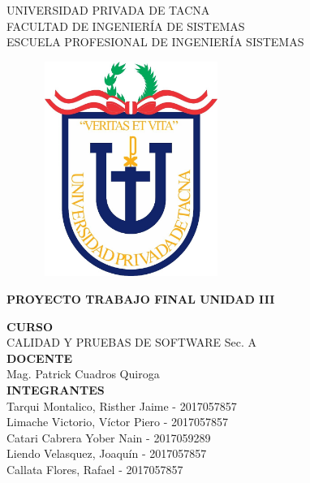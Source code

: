 \documentclass[12pt,a4paper,oneside]{book}
\begin{document}
	
	\thispagestyle{empty} 
	
	\begin{center} 
		\LARGE{UNIVERSIDAD PRIVADA DE TACNA} \\[0.5cm] 
		\Large{FACULTAD DE INGENIERÍA DE SISTEMAS}\\[0.5cm] 
		\large{ ESCUELA PROFESIONAL DE INGENIERÍA SISTEMAS} 
	\end{center}
	
	\begin{figure}[htb]
		\centering \includegraphics[width=6cm, height=7cm]{img/uptlogo.jpg}
	\end{figure}
	
	\begin{center} 
			\LARGE{\bf PROYECTO TRABAJO FINAL \newline UNIDAD III }\\ \vspace{.25cm}
		
	\end{center}

	\begin{center} 
		
		\textbf {CURSO}\\ 
		\large CALIDAD Y PRUEBAS DE SOFTWARE Sec. A \\
		
		\textbf {DOCENTE}\\
		\large Mag. Patrick Cuadros Quiroga\\
	
		\textbf {INTEGRANTES}\\
		\large Tarqui Montalico, Risther Jaime - 2017057857 \\
		\large Limache Victorio, V\'ictor Piero - 2017057857 \\
		\large Catari Cabrera Yober Nain - 2017059289 \\
		\large Liendo Velasquez, Joaqu\'in - 2017057857 \\
		\large Callata Flores, Rafael - 2017057857 \\
		
	\end{center}
\end{document}
